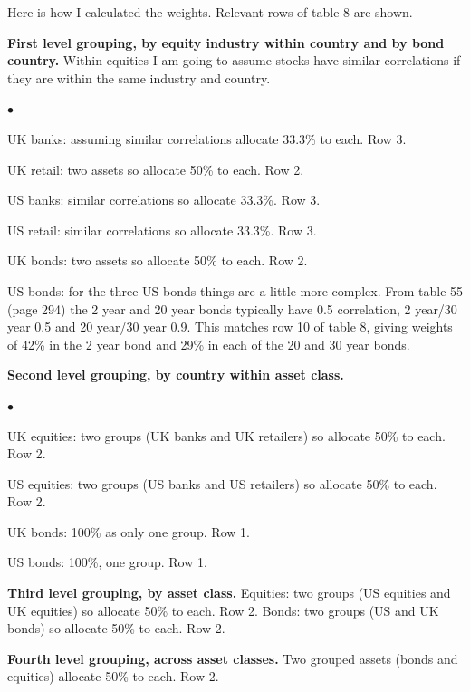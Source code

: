 Here is how I calculated the weights. Relevant rows of table 8 are shown.

\medskip \noindent\textbf{First level grouping, by equity industry within country and by bond country.} Within equities I am going to assume stocks have similar correlations if they are within the same industry and country.
\begin{list}{$\bullet$}{%
  \setlength{\leftmargin}{1.5em}%
  \setlength{\itemsep}{0pt}%
  \setlength{\parsep}{0pt}%
  \setlength{\topsep}{3pt}%
}
\item UK banks: assuming similar correlations allocate 33.3\% to each. Row 3.
\item UK retail: two assets so allocate 50\% to each. Row 2.
\item US banks: similar correlations so allocate 33.3\%. Row 3.
\item US retail: similar correlations so allocate 33.3\%. Row 3.
\item UK bonds: two assets so allocate 50\% to each. Row 2.
\item US bonds: for the three US bonds things are a little more complex. From table 55 (page 294) the 2 year and 20 year bonds typically have 0.5 correlation, 2 year/30 year 0.5 and 20 year/30 year 0.9. This matches row 10 of table 8, giving weights of 42\% in the 2 year bond and 29\% in each of the 20 and 30 year bonds.
\end{list}

\medskip \noindent\textbf{Second level grouping, by country within asset class.}
\begin{list}{$\bullet$}{%
  \setlength{\leftmargin}{1.5em}%
  \setlength{\itemsep}{0pt}%
  \setlength{\parsep}{0pt}%
  \setlength{\topsep}{3pt}%
}
\item UK equities: two groups (UK banks and UK retailers) so allocate 50\% to each. Row 2.
\item US equities: two groups (US banks and US retailers) so allocate 50\% to each. Row 2.
\item UK bonds: 100\% as only one group. Row 1.
\item US bonds: 100\%, one group. Row 1.
\end{list}

\medskip \noindent\textbf{Third level grouping, by asset class.} Equities: two groups (US equities and UK equities) so allocate 50\% to each. Row 2. Bonds: two groups (US and UK bonds) so allocate 50\% to each. Row 2.

\medskip \noindent\textbf{Fourth level grouping, across asset classes.} Two grouped assets (bonds and equities) allocate 50\% to each. Row 2.


